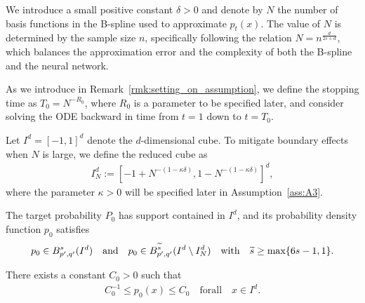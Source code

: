\begin{remark}\label{rmk:setting_on_assumption}
We introduce a small positive constant $\delta>0$ and denote by $N$ the number of basis functions in the B-spline used to approximate $p_t(x)$. The value of $N$ is determined by the sample size $n$, specifically following the relation $N = n^{\frac{d}{2s+d}}$, which balances the approximation error and the complexity of both the B-spline and the neural network. \end{remark}

\begin{definition}\label{def:stop_time}
  As we introduce in Remark~\ref{rmk:setting_on_assumption}, we define the stopping time as $T_0 = N^{-R_0}$, where $R_0$ is a parameter to be specified later, and consider solving the ODE backward in time from $t=1$ down to $t=T_0$.   
\end{definition}

\begin{definition}
Let $I^d = [-1,1]^d$ denote the $d$-dimensional cube. To mitigate boundary effects when $N$ is large, we define the reduced cube as
\begin{align*}
I^d_N := [-1 + N^{-(1-\kappa\delta)}, 1 - N^{-(1-\kappa\delta)}]^d,  
\end{align*}
where the parameter $\kappa > 0$ will be specified later in Assumption~\ref{ass:A3}.
\end{definition}

\begin{assumption}\label{ass:A1}
The target probability $P_0$ has support contained in $I^d$, and its probability density function $p_0$ satisfies
\begin{align*}
    p_0 \in B^s_{p',q'}(I^d)
  \quad\mathrm{and}\quad
  p_0 \in B^{\widetilde{s}}_{p',q'}(I^d \setminus I^d_N)
  \quad\mathrm{with}\quad
  \widetilde{s} \geq \max\{6s-1, 1\}.
\end{align*}
\end{assumption}


\begin{assumption}\label{ass:A2}
There exists a constant $C_0>0$ such that
\begin{align*}
    C_0^{-1} \leq  p_0(x) \leq  C_0 \quad\mathrm{for all}\quad x \in I^d.  
\end{align*}
\end{assumption}

